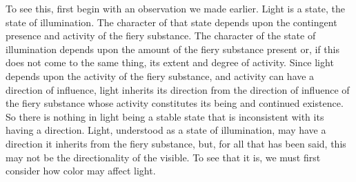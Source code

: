 To see this, first begin with an observation we made earlier. Light is a state, the state of illumination. The character of that state depends upon the contingent presence and activity of the fiery substance. The character of the state of illumination depends upon the amount of the fiery substance present or, if this does not come to the same thing, its extent and degree of activity. Since light depends upon the activity of the fiery substance, and activity can have a direction of influence, light inherits its direction from the direction of influence of the fiery substance whose activity constitutes its being and continued existence. So there is nothing in light being a stable state that is inconsistent with its having a direction. Light, understood as a state of illumination, may have a direction it inherits from the fiery substance, but, for all that has been said, this may not be the directionality of the visible. To see that it is, we must first consider how color may affect light.

